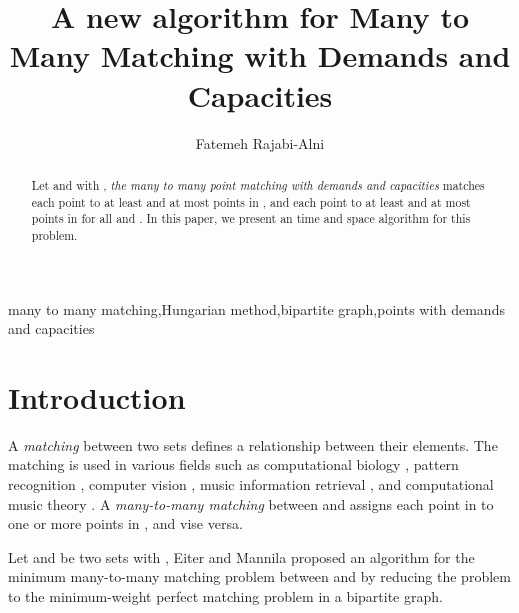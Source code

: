 \documentclass[preprint,12pt]{elsarticle}
\begin{document}
\pagestyle{empty}
\begin{frontmatter}





\title{A new algorithm for Many to Many Matching with Demands and Capacities}



\author[la1]{Fatemeh Rajabi-Alni}



 \address[la1]{Department of Computer Engineering, Islamic Azad University,\\North Tehran Branch, Tehran, Iran.}




\begin{abstract}
Let  and  with , \textit {the many to many point matching with demands and capacities} matches each point  to at least  and at most  points in , and each point  to at least  and at most  points in  for all  and . In this paper, we present an  time and  space algorithm for this problem.
\end{abstract}

\begin{keyword}


many to many matching\sep Hungarian method\sep bipartite graph\sep points with demands and capacities 


\end{keyword}

\end{frontmatter}






\section{Introduction}


A \textit {matching} between two sets defines a relationship between their elements. The matching is used in various fields such as computational biology \cite{1}, pattern recognition \cite{2}, computer vision \cite{3}, music information retrieval \cite{4}, and computational music theory \cite{5}. 
A \textit {many-to-many matching} between  and  assigns each point in  to one or more points in , and vise versa.

Let  and  be two sets with , Eiter and Mannila \cite{6} proposed an  algorithm for the minimum many-to-many matching problem between  and  by reducing the problem to the minimum-weight perfect matching problem in a bipartite graph. 
\end{document}
